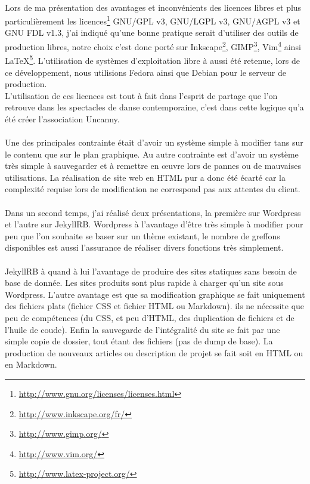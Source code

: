 \documentclass[11pt,a4paper,twoside]{report}
\begin{document}
		\paragraph*{}Lors de ma présentation des avantages et inconvénients des licences libres et plus particulièrement les licences\footnote{\url{http://www.gnu.org/licenses/licenses.html}} GNU/GPL v3, GNU/LGPL v3, GNU/AGPL v3 et GNU FDL v1.3, j'ai indiqué qu'une bonne pratique serait d'utiliser des outils de production libres, notre choix c'est donc porté sur Inkscape\footnote{\url{http://www.inkscape.org/fr/}}, GIMP\footnote{\url{http://www.gimp.org/}}, Vim\footnote{\url{http://www.vim.org/}} ainsi \LaTeX \footnote{\url{http://www.latex-project.org/}}. L'utilisation de systèmes d'exploitation libre à aussi été retenue, lors de ce développement, nous utilisions Fedora ainsi que Debian pour le serveur de production.\\
		L'utilisation de ces licences est tout à fait dans l'esprit de partage que l'on retrouve dans les spectacles de danse contemporaine, c'est dans cette logique qu'a été créer l'association Uncanny.
		\paragraph*{}Une des principales contrainte était d'avoir un système simple à modifier tans sur le contenu que sur le plan graphique. Au autre contrainte est d'avoir un système très simple à sauvegarder et à remettre en œuvre lors de pannes ou de mauvaises utilisations. La réalisation de site web en HTML pur a donc été écarté car la complexité requise lors de modification ne correspond pas aux attentes du client.
		\paragraph*{}Dans un second temps, j'ai réalisé deux présentations, la première sur Wordpress et l'autre sur JekyllRB.
		Wordpress à l'avantage d'être très simple à modifier pour peu que l'on souhaite se baser sur un thème existant, le nombre de greffons disponibles est aussi l'assurance de réaliser divers fonctions très simplement.
		\paragraph*{}JekyllRB à quand à lui l'avantage de produire des sites statiques sans besoin de base de donnée. Les sites produits sont plus rapide à charger qu'un site sous Wordpress. L'autre avantage est que sa modification graphique se fait uniquement des fichiers plats (fichier CSS et fichier HTML ou Markdown). ils ne nécessite que peu de compétences (du CSS, et peu d'HTML, des duplication de fichiers et de l'huile de coude). Enfin la sauvegarde de l'intégralité du site se fait par une simple copie de dossier, tout étant des fichiers (pas de dump de base). La production de nouveaux articles ou description de projet se fait soit en HTML ou en Markdown.
\end{document}
